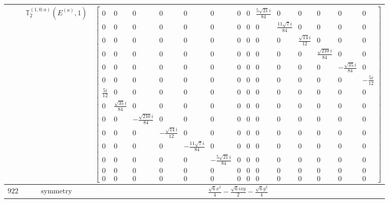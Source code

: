 \documentclass[fleqn,8pt,landscape]{jsarticle}
\begin{document}
\begin{longtable}{ccc}
$  $ & $ \mathbb{T}_{2}^{(1,0;a)}(E^{(a)},1) $ & $ \begin{bmatrix} 0 & 0 & 0 & 0 & 0 & 0 & 0 & 0 & \frac{5 \sqrt{21} i}{84} & 0 & 0 & 0 & 0 & 0 \\ 0 & 0 & 0 & 0 & 0 & 0 & 0 & 0 & 0 & \frac{11 \sqrt{7} i}{84} & 0 & 0 & 0 & 0 \\ 0 & 0 & 0 & 0 & 0 & 0 & 0 & 0 & 0 & 0 & \frac{\sqrt{14} i}{12} & 0 & 0 & 0 \\ 0 & 0 & 0 & 0 & 0 & 0 & 0 & 0 & 0 & 0 & 0 & \frac{\sqrt{210} i}{84} & 0 & 0 \\ 0 & 0 & 0 & 0 & 0 & 0 & 0 & 0 & 0 & 0 & 0 & 0 & - \frac{\sqrt{35} i}{84} & 0 \\ 0 & 0 & 0 & 0 & 0 & 0 & 0 & 0 & 0 & 0 & 0 & 0 & 0 & - \frac{5 i}{12} \\ \frac{5 i}{12} & 0 & 0 & 0 & 0 & 0 & 0 & 0 & 0 & 0 & 0 & 0 & 0 & 0 \\ 0 & \frac{\sqrt{35} i}{84} & 0 & 0 & 0 & 0 & 0 & 0 & 0 & 0 & 0 & 0 & 0 & 0 \\ 0 & 0 & - \frac{\sqrt{210} i}{84} & 0 & 0 & 0 & 0 & 0 & 0 & 0 & 0 & 0 & 0 & 0 \\ 0 & 0 & 0 & - \frac{\sqrt{14} i}{12} & 0 & 0 & 0 & 0 & 0 & 0 & 0 & 0 & 0 & 0 \\ 0 & 0 & 0 & 0 & - \frac{11 \sqrt{7} i}{84} & 0 & 0 & 0 & 0 & 0 & 0 & 0 & 0 & 0 \\ 0 & 0 & 0 & 0 & 0 & - \frac{5 \sqrt{21} i}{84} & 0 & 0 & 0 & 0 & 0 & 0 & 0 & 0 \\ 0 & 0 & 0 & 0 & 0 & 0 & 0 & 0 & 0 & 0 & 0 & 0 & 0 & 0 \\ 0 & 0 & 0 & 0 & 0 & 0 & 0 & 0 & 0 & 0 & 0 & 0 & 0 & 0 \end{bmatrix} $ \\ \hline
$ 922 $ & $ \text{symmetry} $ & $ \frac{\sqrt{6} x^{2}}{4} - \frac{\sqrt{6} i x y}{2} - \frac{\sqrt{6} y^{2}}{4} $ \\

\end{longtable}
\end{document}
